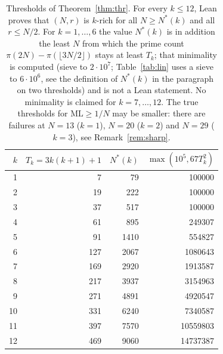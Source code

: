 \documentclass[11pt]{article}
\theoremstyle{definition}
\theoremstyle{remark}
\newcommand{\ML}{\mathrm{ML}}
\begin{document}
\begin{table}[ht]
\centering
\small
\begin{tabular}{r r r r}
\toprule
$k$ & $T_k=3k(k+1)+1$ & $N^*(k)$ & $\max(10^5,67T_k^2)$ \\
\midrule
1 & 7 & 79 & 100000 \\
2 & 19 & 222 & 100000 \\
3 & 37 & 517 & 100000 \\
4 & 61 & 895 & 249307 \\
5 & 91 & 1410 & 554827 \\
6 & 127 & 2067 & 1080643 \\
7 & 169 & 2920 & 1913587 \\
8 & 217 & 3937 & 3154963 \\
9 & 271 & 4891 & 4920547 \\
10 & 331 & 6240 & 7340587 \\
11 & 397 & 7570 & 10559803 \\
12 & 469 & 9060 & 14737387 \\
\bottomrule
\end{tabular}
\caption{Thresholds of Theorem~\ref{thm:thr}. For every $k\le12$, Lean proves that $(N,r)$ is $k$-rich for all $N\ge N^*(k)$ and all $r\le N/2$. For $k=1,\dots,6$ the value $N^*(k)$ is in addition the least $N$ from which the prime count $\pi(2N)-\pi(\lfloor3N/2\rfloor)$ stays at least $T_k$; that minimality is computed (sieve to $2\cdot10^7$; Table~\ref{tab:lin} uses a sieve to $6\cdot10^6$, see the definition of $N^*(k)$ in the paragraph on two thresholds) and is not a Lean statement. No minimality is claimed for $k=7,\dots,12$. The true thresholds for $\ML\ge1/N$ may be smaller: there are failures at $N=13$ ($k=1$), $N=20$ ($k=2$) and $N=29$ ($k=3$), see Remark~\ref{rem:sharp}.}
\label{tab:thr}
\end{table}
\end{document}
